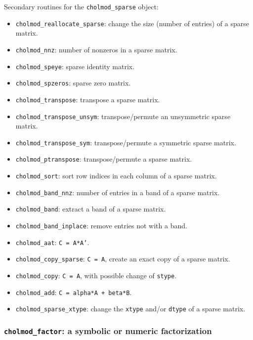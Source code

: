 \documentclass[11pt]{article}
\begin{document}
\noindent Secondary routines for the {\tt cholmod\_sparse} object:
    \begin{itemize}
    \item {\tt cholmod\_reallocate\_sparse}: change the size (number of
    entries) of a sparse matrix.
    \item {\tt cholmod\_nnz}: number of nonzeros in a sparse matrix.
    \item {\tt cholmod\_speye}: sparse identity matrix.
    \item {\tt cholmod\_spzeros}: sparse zero matrix.
    \item {\tt cholmod\_transpose}: transpose a sparse matrix.
    \item {\tt cholmod\_transpose\_unsym}: transpose/permute an unsymmetric
    sparse matrix.
    \item {\tt cholmod\_transpose\_sym}: transpose/permute a symmetric sparse
    matrix.
    \item {\tt cholmod\_ptranspose}: transpose/permute a sparse matrix.
    \item {\tt cholmod\_sort}: sort row indices in each column of a sparse
    matrix.
    \item {\tt cholmod\_band\_nnz}: number of entries in a band of a sparse
    matrix.
    \item {\tt cholmod\_band}: extract a band of a sparse matrix.
    \item {\tt cholmod\_band\_inplace}: remove entries not with a band.
    \item {\tt cholmod\_aat}: {\tt C = A*A'}.
    \item {\tt cholmod\_copy\_sparse}: {\tt C = A}, create an exact copy of a
    sparse matrix.
    \item {\tt cholmod\_copy}: {\tt C = A}, with possible change of {\tt stype}.
    \item {\tt cholmod\_add}: {\tt C = alpha*A + beta*B}.
    \item {\tt cholmod\_sparse\_xtype}: change the {\tt xtype} and/or
        {\tt dtype} of a sparse matrix.
    \end{itemize}

\subsubsection{{\tt cholmod\_factor}: a symbolic or numeric factorization}
\end{document}
